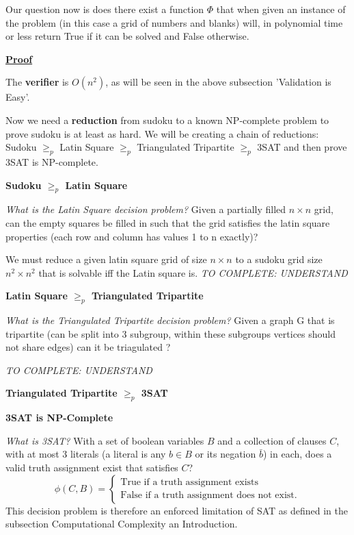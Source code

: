 \documentclass[a4paper,12pt]{article}
\begin{document}
Our question now is does there exist a function $\Phi$ that when given an instance of the problem (in this case a grid of numbers and blanks) will, in polynomial time or less return True if it can be solved and False otherwise.

\textbf{\underline{Proof}}

The \textbf{verifier} is $O(n^2)$, as will be seen in the above subsection 'Validation is Easy'.

Now we need a \textbf{reduction} from sudoku to a known NP-complete problem to prove sudoku is at least as hard. We will be creating a chain of reductions: Sudoku $\geq_p$  Latin Square $\geq_p$  Triangulated Tripartite $\geq_p$  3SAT and then prove 3SAT is NP-complete.

\textbf{Sudoku $\geq_p$ Latin Square}

\textit{What is the Latin Square decision problem?} Given a partially filled $n \times n$ grid, can the empty squares be filled in such that the grid satisfies the latin square properties (each row and column has values 1 to n exactly)?

We must reduce a given latin square grid of size $n \times n$ to a sudoku grid size $n^2 \times n^2$ that is solvable iff the Latin square is. \textit{TO COMPLETE: UNDERSTAND \cite{Complexity}}

\textbf{Latin Square $\geq_p$ Triangulated Tripartite}

\textit{What is the Triangulated Tripartite decision problem?} Given a graph G that is tripartite (can be split into 3 subgroup, within these subgroups vertices should not share edges) can it be triagulated ?


 \textit{TO COMPLETE: UNDERSTAND \cite{latin to tripartite}}

\textbf{Triangulated Tripartite $\geq_p$ 3SAT}

\textbf{3SAT is NP-Complete}

\textit{What is 3SAT?} With a set of boolean variables $B$ and a collection of clauses $C$, with at most 3 literals (a literal is any $b \in B$ or its negation $\bar{b}$) in each, does a valid truth assignment exist that satisfies $C$?
		\begin{equation}
		        \phi (C,B) = \begin{cases}
		            \text{True if a truth assignment exists} \\
		            \text{False if a truth assignment does not exist}.
				\end{cases}
		\end{equation}
This decision problem is therefore an enforced limitation of SAT as defined in the subsection Computational Complexity an Introduction.
\end{document}
